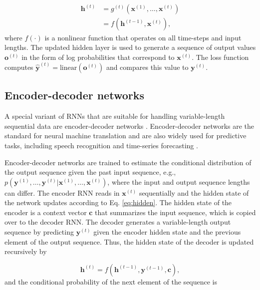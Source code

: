 \documentclass[hidelinks,12pt]{article}
\begin{document}
\begin{align}
\mathbf{h}^{(t)} &= g^{(t)} \left(\mathbf{x}^{(1)}, \ldots, \mathbf{x}^{(t)} \right) \nonumber \\ 
&= f \left( \mathbf{h}^{(t-1)}, \mathbf{x}^{(t)} \right), \label{eq:hidden}
\end{align} where $f(\cdot)$ is a nonlinear function that operates on all time-steps and input lengths. The updated hidden layer is used to generate a sequence of output values $\mathbf{o}^{(t)}$ in the form of log probabilities that correspond to $\mathbf{x}^{(t)}$. The loss function computes $\mathbf{\hat{y}}^{(t)} = \mathrm{linear} (\mathbf{o}^{(t)})$ and compares this value to $\mathbf{y}^{(t)}$.

\subsection{Encoder-decoder networks}

A special variant of RNNs that are suitable for handling variable-length sequential data are encoder-decoder networks \citep{cho2014learning}. Encoder-decoder networks are the standard for neural machine translation \citep{bahdanau2014neural,vinyals2014grammar} and are also widely used for predictive tasks, including speech recognition \citep{chorowski2015attention} and time-series forecasting \citep{zhu2017deep}. 

Encoder-decoder networks are trained to estimate the conditional distribution of the output sequence given the past input sequence, e.g., $p (\mathbf{y}^{(1)}, \ldots, \mathbf{y}^{(t)} | \mathbf{x}^{(1)}, \ldots, \mathbf{x}^{(t)})$, where the input and output sequence lengths can differ. The encoder RNN reads in $\mathbf{x}^{(t)}$ sequentially and the hidden state of the network updates according to Eq. \ref{eq:hidden}. The hidden state of the encoder is a context vector $\mathbf{c}$ that summarizes the input sequence, which is copied over to the decoder RNN. The decoder generates a variable-length output sequence by predicting $\mathbf{y}^{(t)}$ given the encoder hidden state and the previous element of the output sequence. Thus, the hidden state of the decoder is updated recursively by

\begin{equation}
\mathbf{h}^{(t)} = f \left( \mathbf{h}^{(t-1)}, \mathbf{y}^{(t-1)}, \mathbf{c} \right), \label{eq:decoder}
\end{equation} and the conditional probability of the next element of the sequence is 
\end{document}
